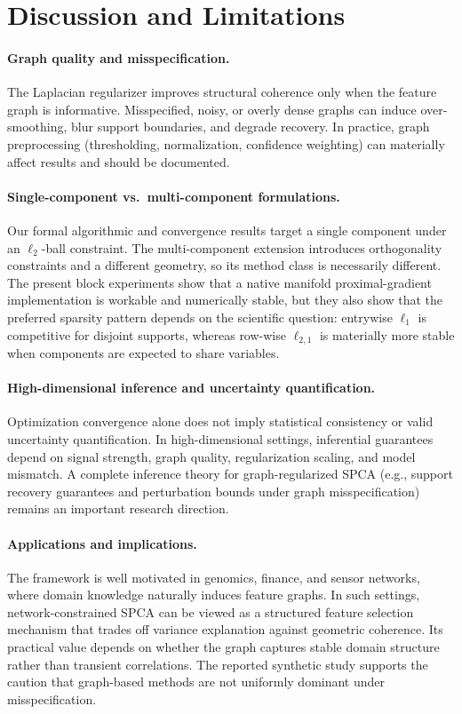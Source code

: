\documentclass[10pt,twocolumn,letterpaper]{article}
\theoremstyle{definition}
\begin{document}
\section{Discussion and Limitations}
\paragraph{Graph quality and misspecification.}
The Laplacian regularizer improves structural coherence only when the feature graph is informative. Misspecified, noisy, or overly dense graphs can induce over-smoothing, blur support boundaries, and degrade recovery. In practice, graph preprocessing (thresholding, normalization, confidence weighting) can materially affect results and should be documented.

\paragraph{Single-component vs.\ multi-component formulations.}
Our formal algorithmic and convergence results target a single component under an $\ell_2$-ball constraint. The multi-component extension introduces orthogonality constraints and a different geometry, so its method class is necessarily different. The present block experiments show that a native manifold proximal-gradient implementation is workable and numerically stable, but they also show that the preferred sparsity pattern depends on the scientific question: entrywise $\ell_1$ is competitive for disjoint supports, whereas row-wise $\ell_{2,1}$ is materially more stable when components are expected to share variables.

\paragraph{High-dimensional inference and uncertainty quantification.}
Optimization convergence alone does not imply statistical consistency or valid uncertainty quantification. In high-dimensional settings, inferential guarantees depend on signal strength, graph quality, regularization scaling, and model mismatch. A complete inference theory for graph-regularized SPCA (e.g., support recovery guarantees and perturbation bounds under graph misspecification) remains an important research direction.

\paragraph{Applications and implications.}
The framework is well motivated in genomics, finance, and sensor networks, where domain knowledge naturally induces feature graphs. In such settings, network-constrained SPCA can be viewed as a structured feature selection mechanism that trades off variance explanation against geometric coherence. Its practical value depends on whether the graph captures stable domain structure rather than transient correlations. The reported synthetic study supports the caution that graph-based methods are not uniformly dominant under misspecification.
\end{document}
